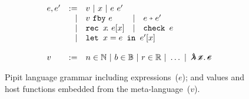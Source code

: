 \begin{figure}
  \[
  \begin{array}{lrlll}
    e, e' & := & v ~|~ x ~|~ e~e' \\
          & | & \xfby{v}{e} & | & \xthen{e}{e'} \\
          & | & \xrec{x}{e[x]} & | & \xcheck{e} \\
          & | & \multicolumn{3}{l}{\xlet{x}{e}{e'[x]}} \\
    \\
    v & := & \multicolumn{3}{l}{n \in \mathbb{N} ~|~ b \in \mathbb{B} ~|~ r \in \mathbb{R} ~|~ \hdots ~|~ \mlamX} \\
    \end{array}
  \]
  \caption{Pipit language grammar including expressions~($e$); and values and host functions embedded from the \fstar{} meta-language~($v$).}
  \label{f:core-grammar}
\end{figure}